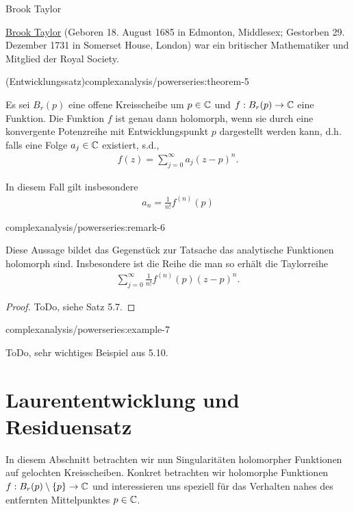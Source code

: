 \begin{emphBox}{Brook Taylor}{}

\par
\href{https://de.wikipedia.org/wiki/Brook\_Taylor}{Brook Taylor} (Geboren 18. August 1685 in Edmonton, Middlesex; Gestorben 29. Dezember 1731 in Somerset House, London) war ein britischer Mathematiker und Mitglied der Royal Society.
\end{emphBox}
\begin{theorem}{(Entwicklungssatz)}{complexanalysis/powerseries:theorem-5}



\par
Es sei \(B_r(p)\) eine offene Kreisscheibe um \(p\in\mathbb{C}\) und \(f:B_r(p)\to\mathbb{C}\) eine Funktion. Die Funktion \(f\) ist genau dann holomorph, wenn sie durch eine konvergente Potenzreihe mit Entwicklungspunkt \(p\) dargestellt werden kann, d.h. falls eine Folge \(a_j\in\mathbb{C}\) existiert, s.d.,
\begin{align*}
f(z) = \sum_{j=0}^\infty a_j (z-p)^n.
\end{align*}
\par
In diesem Fall gilt insbesondere
\begin{align*}
a_n = \frac{1}{n!} f^{(n)}(p)
\end{align*}\end{theorem}
\begin{remark}{}{complexanalysis/powerseries:remark-6}



\par
Diese Aussage bildet das Gegenstück zur Tatsache das analytische Funktionen holomorph sind. Insbesondere ist die Reihe die man so erhält die Taylorreihe
\begin{align*}
\sum_{j=0}^\infty \frac{1}{n!} f^{(n)}(p) (z-p)^n.
\end{align*}\end{remark}

\begin{proof}
 ToDo, siehe \cite{Nee17} Satz 5.7.
\end{proof}
\begin{example}{}{complexanalysis/powerseries:example-7}



\par
ToDo, sehr wichtiges Beispiel aus \cite{Nee17} 5.10.
\end{example}


\section{Laurententwicklung und Residuensatz}
\label{\detokenize{complexanalysis/residuensatz:laurententwicklung-und-residuensatz}}\label{\detokenize{complexanalysis/residuensatz::doc}}
\par
In diesem Abschnitt betrachten wir nun Singularitäten holomorpher Funktionen auf gelochten Kreisscheiben. Konkret betrachten wir holomorphe Funktionen \(f:B_r(p)\setminus\{p\}\to\mathbb{C}\) und interessieren uns speziell für das Verhalten nahes des entfernten Mittelpunktes \(p\in\mathbb{C}\).


